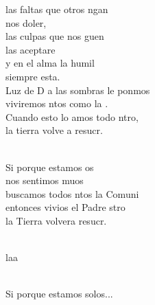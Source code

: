 \documentclass[12pt]{article}
\begin{document}
\begin{multicols*}{2}
\begin{cancion}
	las faltas que otros ngan \\
	nos doler,\\
	las culpas que nos guen \\
	las aceptare\\
	y en el alma la humil \\
	siempre esta.\\
	Luz de D a las sombras le ponmos\\
	viviremos ntos como la .\\
	Cuando esto lo amos todo ntro,\\
	la tierra volve a resucr.\\\jump\\
	\begin{chorus}%
	Si porque estamos os \\
	nos sentimos muos\\
	buscamos todos ntos la Comuni\\
	entonces vivios el Padre stro\\
	la Tierra volvera resucr.\\
	\end{chorus}%
	\jump\\
	laa    \\\jump\\
	\begin{chorus}%
Si porque estamos solos...\\
	\end{chorus}%
	\jump\\
\end{cancion}%


\end{multicols*}
\end{document}
